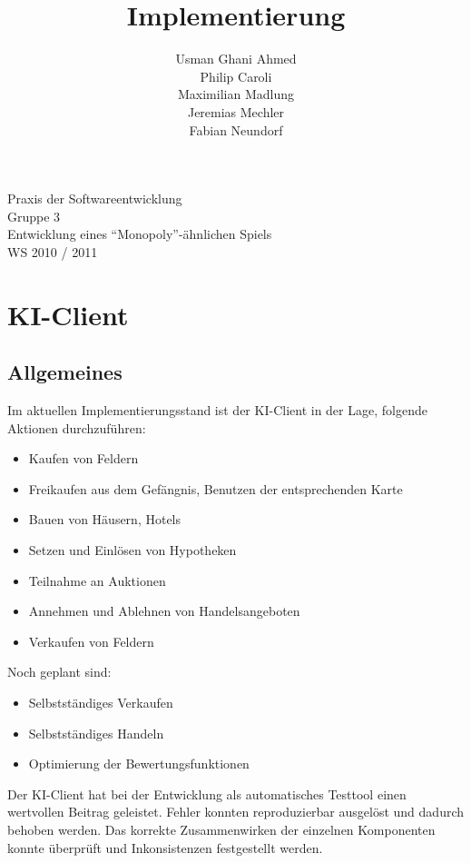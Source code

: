 \documentclass[a4paper,10pt]{article}
\title{Implementierung}
\date{}
\author{Usman Ghani Ahmed \\
Philip Caroli\\
Maximilian Madlung\\ 
Jeremias Mechler\\ 
Fabian Neundorf}
\begin{document}
 
\vspace{5cm}
\maketitle
\begin{center}
\vspace{3cm}
\huge{Praxis der Softwareentwicklung \\
Gruppe 3 \\[0.5cm]
Entwicklung eines "`Monopoly"'-ähnlichen Spiels \\[0.5cm]
WS 2010 / 2011} \\[2cm]
\end{center}

\newpage

\tableofcontents

\newpage

\section{KI-Client}

\subsection{Allgemeines}
Im aktuellen Implementierungsstand ist der KI-Client in der Lage, folgende Aktionen durchzuführen:
\begin{itemize}
\item Kaufen von Feldern
\item Freikaufen aus dem Gefängnis, Benutzen der entsprechenden Karte
\item Bauen von Häusern, Hotels
\item Setzen und Einlösen von Hypotheken
\item Teilnahme an Auktionen
\item Annehmen und Ablehnen von Handelsangeboten
\item Verkaufen von Feldern
\end{itemize}
Noch geplant sind:
\begin{itemize}
\item Selbstständiges Verkaufen
\item Selbstständiges Handeln
\item Optimierung der Bewertungsfunktionen
\end{itemize}
Der KI-Client hat bei der Entwicklung als automatisches Testtool einen wertvollen Beitrag geleistet. Fehler konnten reproduzierbar ausgelöst und dadurch behoben werden. Das korrekte Zusammenwirken der einzelnen Komponenten konnte überprüft und Inkonsistenzen festgestellt werden.
\end{document}
